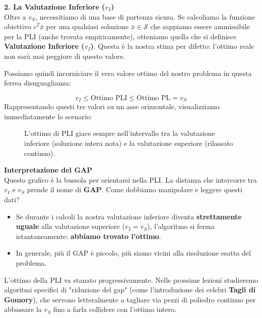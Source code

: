 \documentclass[12pt, a4paper]{article}
\begin{document}
	\textbf{2. La Valutazione Inferiore ($v_I$)}\\
	Oltre a $v_S$, necessitiamo di una base di partenza sicura. Se calcoliamo la funzione obiettivo $c^T \bar{x}$ per una qualsiasi soluzione $\bar{x} \in \mathcal{S}$ che sappiamo essere ammissibile per la PLI (anche trovata empiricamente), otteniamo quella che si definisce \textbf{Valutazione Inferiore ($v_I$)}. Questa è la nostra stima per difetto: l'ottimo reale non sarà mai peggiore di questo valore.
	
	Possiamo quindi incorniciare il vero valore ottimo del nostro problema in questa ferrea disuguaglianza:
	
	$$v_I \leq \text{Ottimo PLI} \leq \text{Ottimo PL} = v_S$$
	Rappresentando questi tre valori su un asse orizzontale, visualizziamo immediatamente lo scenario:
	
	\begin{figure}[H]
		\centering
		\caption{L'ottimo di PLI giace sempre nell'intervallo tra la valutazione inferiore (soluzione intera nota) e la valutazione superiore (rilassato continuo).}
	\end{figure}
	
	\textbf{Interpretazione del GAP}\\
	Questo grafico è la bussola per orientarsi nella PLI. La distanza che intercorre tra $v_I$ e $v_S$ prende il nome di \textbf{GAP}. 
	Come dobbiamo manipolare e leggere questi dati? 
	\begin{itemize}[label=\textcolor{titlecolor}{\Large\textbullet}, itemsep=2pt, leftmargin=1.5cm]
		\item Se durante i calcoli la nostra valutazione inferiore diventa \textbf{strettamente uguale} alla valutazione superiore ($v_I = v_S$), l'algoritmo si ferma istantaneamente: \textbf{abbiamo trovato l'ottimo}.
		\item In generale, più il GAP è piccolo, più siamo vicini alla risoluzione esatta del problema.
	\end{itemize}
	L'ottimo della PLI va stanato progressivamente. Nelle prossime lezioni studieremo algoritmi specifici di "riduzione del gap" (come l'introduzione dei celebri \textbf{Tagli di Gomory}), che servono letteralmente a tagliare via pezzi di poliedro continuo per abbassare la $v_S$ fino a farla collidere con l'ottimo intero.
	
\end{document}
